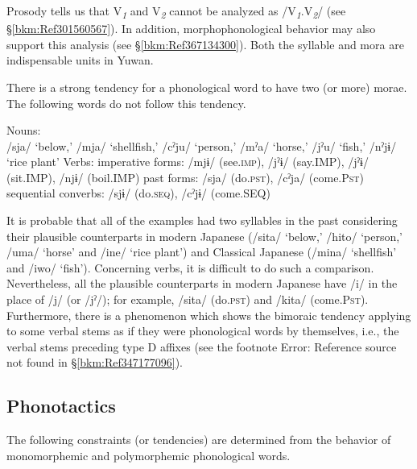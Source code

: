 Prosody tells us that V\textit{\textsubscript{1}} and V\textit{\textsubscript{2}} cannot be analyzed as /V\textit{\textsubscript{1}}.V\textit{\textsubscript{2}}/ (see §\ref{bkm:Ref301560567}). In addition, morphophonological behavior may also support this analysis (see §\ref{bkm:Ref367134300}). Both the syllable and mora are indispensable units in Yuwan.

There is a strong tendency for a phonological word to have two (or more) morae. The following words do not follow this tendency.

\ea 
\ea Nouns:\\
    /sja/ ‘below,’ /mja/\footnotemark{} ‘shellfish,’ /cˀju/ ‘person,’ /mˀa/ ‘horse,’ /jˀu/ ‘fish,’ /nˀjɨ/ ‘rice plant’
\ex Verbs:
\ea imperative forms: /mjɨ/ (see.\textsc{imp}), /jˀɨ/ (say.IMP), /jˀɨ/ (sit.IMP), /njɨ/ (boil.IMP)
\ex past forms: /sja/ (do.\textsc{pst}), /cˀja/ (come.P\textsc{st})
\ex sequential converbs:  /sjɨ/ (do.\textsc{seq}), /cˀjɨ/ (come.SEQ)
\z
\z
\z
{}

It is probable that all of the examples had two syllables in the past considering their plausible counterparts in modern Japanese (/sita/ ‘below,’ /hito/ ‘person,’ /uma/ ‘horse’ and /ine/ ‘rice plant’) and Classical Japanese (/mina/ ‘shellfish’ and /iwo/ ‘fish’). Concerning verbs, it is difficult to do such a comparison. Nevertheless, all the plausible counterparts in modern Japanese have /i/ in the place of /j/ (or /jˀ/); for example, /sita/ (do.\textsc{pst}) and /kita/ (come.P\textsc{st}). Furthermore, there is a phenomenon which shows the bimoraic tendency applying to some verbal stems as if they were phonological words by themselves, i.e., the verbal stems preceding type D affixes (see the footnote Error: Reference source not found in §\ref{bkm:Ref347177096}).

\subsection{Phonotactics}
\label{bkm:Ref302599510}\hypertarget{RefHeadingToc395696971}{}
The following constraints (or tendencies) are determined from the behavior of monomorphemic and polymorphemic phonological words.

